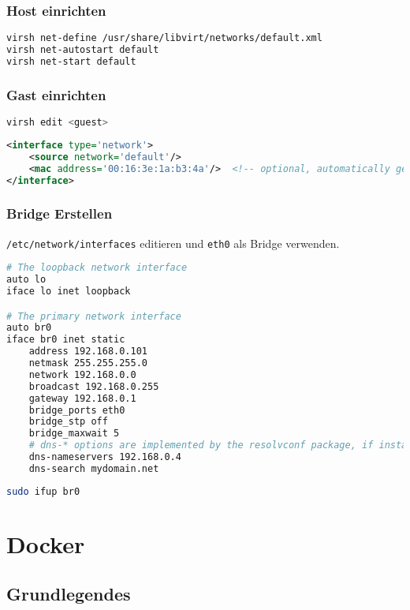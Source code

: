 \subsubsection{Host einrichten}
\begin{lstlisting}[language=bash]
virsh net-define /usr/share/libvirt/networks/default.xml
virsh net-autostart default
virsh net-start default
\end{lstlisting}

\subsubsection{Gast einrichten}
\begin{lstlisting}[language=bash]
  virsh edit <guest>
\end{lstlisting}
\begin{lstlisting}[language=xml]
<interface type='network'>
	<source network='default'/>
	<mac address='00:16:3e:1a:b3:4a'/>  <!-- optional, automatically generated if omitted-->
</interface>
\end{lstlisting}




\subsubsection{Bridge Erstellen}
\lstinline|/etc/network/interfaces| editieren und \lstinline|eth0| als Bridge verwenden.
\begin{lstlisting}[language=bash]
# The loopback network interface
auto lo
iface lo inet loopback

# The primary network interface
auto br0
iface br0 inet static
	address 192.168.0.101
	netmask 255.255.255.0
	network 192.168.0.0
	broadcast 192.168.0.255
	gateway 192.168.0.1
	bridge_ports eth0
	bridge_stp off
	bridge_maxwait 5
	# dns-* options are implemented by the resolvconf package, if installed
	dns-nameservers 192.168.0.4
	dns-search mydomain.net
\end{lstlisting}
\begin{lstlisting}[language=bash]
sudo ifup br0
\end{lstlisting}


\section{Docker}
\subsection{Grundlegendes}

